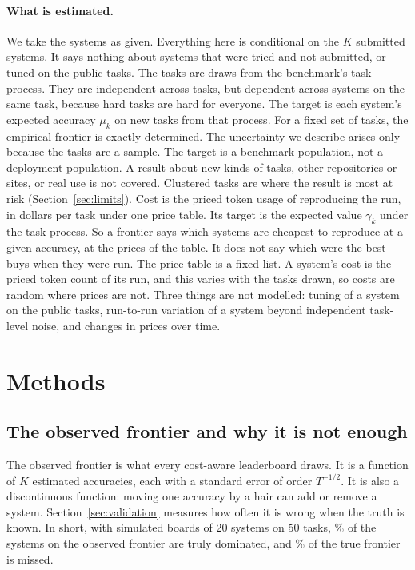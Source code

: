 \documentclass[11pt]{article}
\begin{document}
\paragraph{What is estimated.}
We take the systems as given. Everything here is conditional on the $K$ submitted systems. It says nothing about systems that were tried and not submitted, or tuned on the public tasks. The tasks are draws from the benchmark's task process. They are independent across tasks, but dependent across systems on the same task, because hard tasks are hard for everyone. The target is each system's expected accuracy $\mu_k$ on new tasks from that process. For a fixed set of tasks, the empirical frontier is exactly determined. The uncertainty we describe arises only because the tasks are a sample. The target is a benchmark population, not a deployment population. A result about new kinds of tasks, other repositories or sites, or real use is not covered. Clustered tasks are where the result is most at risk (Section~\ref{sec:limits}). Cost is the priced token usage of reproducing the run, in dollars per task under one price table. Its target is the expected value $\gamma_k$ under the task process. So a frontier says which systems are cheapest to reproduce at a given accuracy, at the prices of the table. It does not say which were the best buys when they were run. The price table is a fixed list. A system's cost is the priced token count of its run, and this varies with the tasks drawn, so costs are random where prices are not. Three things are not modelled: tuning of a system on the public tasks, run-to-run variation of a system beyond independent task-level noise, and changes in prices over time.

\section{Methods}
\label{sec:methods}

\subsection{The observed frontier and why it is not enough}
The observed frontier is what every cost-aware leaderboard draws. It is a function of $K$ estimated accuracies, each with a standard error of order $T^{-1/2}$. It is also a discontinuous function: moving one accuracy by a hair can add or remove a system. Section~\ref{sec:validation} measures how often it is wrong when the truth is known. In short, with \NumValR{} simulated boards of 20 systems on 50 tasks, \NumValNaiveFalseA\% of the systems on the observed frontier are truly dominated, and \NumValNaiveMissedA\% of the true frontier is missed.
\end{document}
